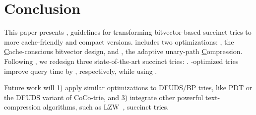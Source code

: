 \section{Conclusion}\label{sec:conclusion}

\balance This paper presents \csquared, guidelines for transforming
bitvector-based succinct tries to more cache-friendly and compact
versions. \csquared includes two optimizations: \bvdesign, the
\underline{C}ache-conscious bitvector design,
and %
\compressionscheme, the adaptive unary-path \underline{C}ompression.
Following \csquared, we redesign three state-of-the-art succinct tries:
. 
\csquared-optimized tries improve query time by
\newrev{\csqfstspeedup/\csqcocospeedup/\csqmarisaspeedup},
respectively, while using
.

Future work will 1) apply similar \bv optimizations to
DFUDS/BP tries, like PDT or the DFUDS variant of CoCo-trie,  and 3) integrate other powerful text-compression
algorithms, such as LZW~\cite{lzw},  succinct tries.

